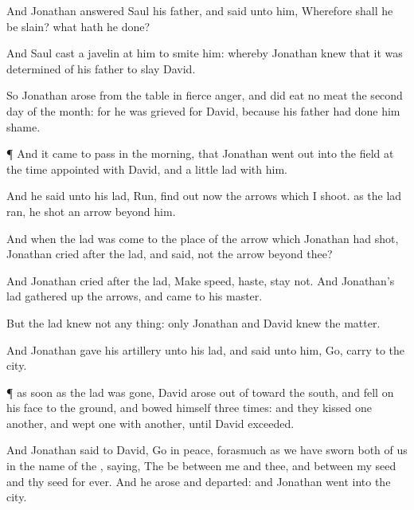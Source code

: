 {And
Jonathan
answered
Saul his
father, and
said unto him, Wherefore shall he be
slain? what hath he
done?

And
Saul
cast a
javelin at him to
smite him: whereby
Jonathan
knew that it was
determined of his
father to
slay
David.

So
Jonathan
arose from the
table in
fierce
anger, and did
eat no
meat the
second
day of the
month: for he was
grieved for
David, because his
father had done him
shame.


\par }{\PP {}¶ And it came to pass in the
morning, that
Jonathan went
out into the
field at the time
appointed with
David, and a
little
lad with him.

And he
said unto his
lad,
Run, find
out now the
arrows which I
shoot.
{} as the
lad
ran, he
shot an
arrow
beyond him.

And when the
lad was
come to the
place of the
arrow which
Jonathan had
shot,
Jonathan
cried
after the
lad, and
said,
{} not the
arrow
beyond thee?

And
Jonathan
cried
after the
lad, Make
speed,
haste,
stay not. And
Jonathan’s
lad gathered
up the
arrows, and
came to his
master.

But the
lad
knew not any
thing: only
Jonathan and
David
knew the
matter.

And
Jonathan
gave his
artillery unto his
lad, and
said unto him,
Go,
carry
{} to the
city.


\par }{\PP {}¶
{} as soon as the
lad was
gone,
David
arose out of
{}
toward the
south, and
fell on his
face to the
ground, and
bowed himself
three
times: and they
kissed
one
another, and
wept
one with
another, until
David
exceeded.

And
Jonathan
said to
David,
Go in
peace, forasmuch as we have
sworn
both of us in the
name of the
{},
saying, The
{} be between me and thee, and between my
seed and thy
seed
for
ever. And he
arose and
departed: and
Jonathan
went into the
city.




\par }
